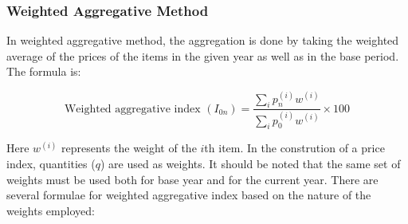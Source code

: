 \documentclass[twoside]{book}
\begin{document}
\subsubsection{Weighted Aggregative Method}
In weighted aggregative method, the aggregation is done by taking the weighted average of the prices of the items in the given year as well as in the base period. The formula is:
\begin{textbox}
\begin{equation*}
    \text{Weighted aggregative index } (I_{0n}) = \frac{\displaystyle\sum_i p_n^{(i)} w^{(i)}}{\displaystyle\sum_i p_0^{(i)} w^{(i)}} \times 100
\end{equation*}
\end{textbox}

Here $w^{(i)}$ represents the weight of the $i$th item. In the constrution of a price index, quantities ($q$) are used as weights. It should be noted that the same set of weights must be used both for base year and for the current year. There are several formulae for weighted aggregative index based on the nature of the weights employed:
\end{document}
